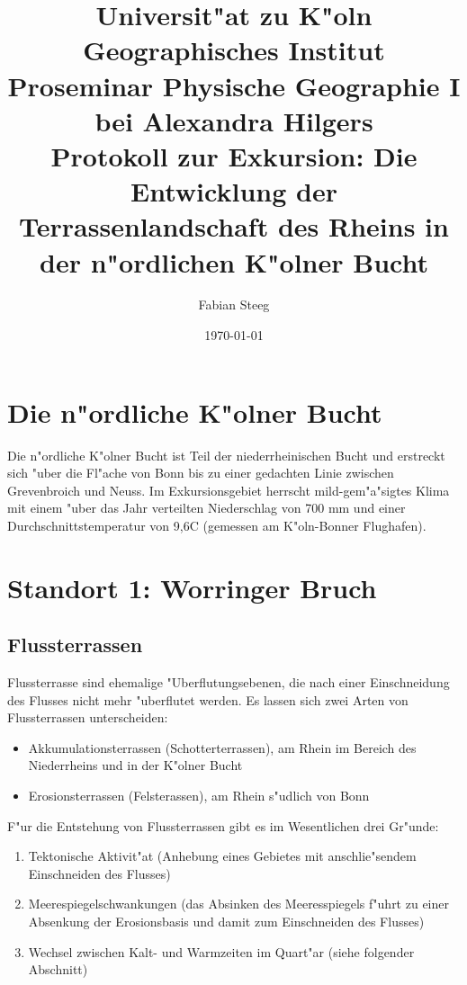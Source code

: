 \documentclass[titlepage,a4paper]{article}
\author{Fabian Steeg}
\date{\today}
\title{\Large{Universit"at zu K"oln \\ Geographisches Institut }\\[5ex] 
\large{Proseminar Physische Geographie I\\ bei Alexandra Hilgers}\\[10ex] 
\LARGE{Protokoll zur Exkursion: Die Entwicklung der Terrassenlandschaft des 
Rheins in der n"ordlichen K"olner Bucht}\\[5ex]}
\begin{document}
\begin{titlepage}
\maketitle
\tableofcontents
\listoffigures
\thispagestyle{empty}
\end{titlepage}
\newpage


\section{Die n"ordliche K"olner Bucht}
    
    Die n"ordliche K"olner Bucht ist Teil der niederrheinischen Bucht und erstreckt 
    sich "uber die Fl"ache von Bonn bis zu einer gedachten Linie zwischen Grevenbroich 
    und Neuss. Im Exkursionsgebiet herrscht mild-gem"a"sigtes Klima mit einem "uber 
    das Jahr verteilten Niederschlag von 700 mm und einer Durchschnittstemperatur von 
    9,6\textdegree C (gemessen am K"oln-Bonner Flughafen).

\section{Standort 1: Worringer Bruch}

\subsection{Flussterrassen}

Flussterrasse sind ehemalige "Uberflutungsebenen, die nach einer Einschneidung des Flusses nicht mehr "uberflutet werden. Es lassen sich zwei Arten von Flussterrassen unterscheiden:

\begin{itemize}
\item{Akkumulationsterrassen (Schotterterrassen), am Rhein im Bereich des Niederrheins und in der K"olner Bucht}
\item{Erosionsterrassen (Felsterassen), am Rhein s"udlich von Bonn}
\end{itemize}

F"ur die Entstehung von Flussterrassen gibt es im Wesentlichen drei Gr"unde:

\begin{enumerate}
\item{Tektonische Aktivit"at (Anhebung eines Gebietes mit anschlie"sendem Einschneiden des Flusses)}
\item{Meerespiegelschwankungen (das Absinken des Meeresspiegels f"uhrt zu einer Absenkung der Erosionsbasis und damit zum Einschneiden des Flusses)}
\item{Wechsel zwischen Kalt- und Warmzeiten im Quart"ar (siehe folgender Abschnitt)}
\end{enumerate}
    
\end{document}
